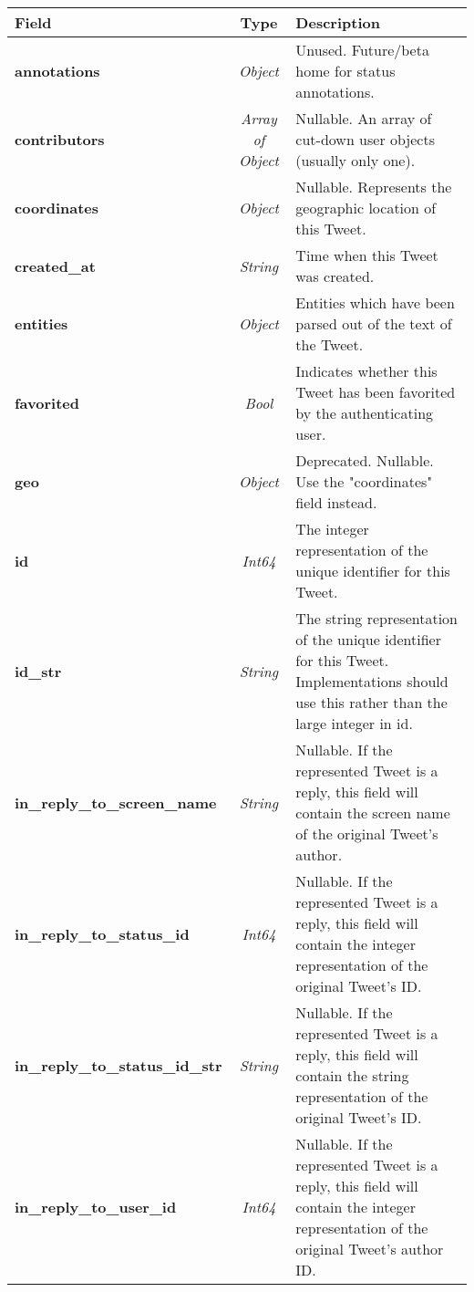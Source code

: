 
	
\begin{table}
\renewcommand{\arraystretch}{1.3}
\centering
\begin{tabular}{|l|c|p{9cm}|} 
\hline \bf Field	&	\bf Type &	\bf Description \\ \hline \hline

\bf annotations						&	\it Object			&	Unused. Future/beta home for status annotations.  \\ \hline
\bf contributors					&	\it Array of Object &	Nullable. An array of cut-down user objects (usually only one).  \\\hline 
\bf coordinates						&	\it Object			&	Nullable. Represents the geographic location of this Tweet.   \\ \hline
\bf created\_at						&	\it String			&	Time when this Tweet was created. \\ \hline
\bf entities						&	\it Object			&	Entities which have been parsed out of the text of the Tweet. \\ \hline
\bf favorited						&	\it Bool			&	Indicates whether this Tweet has been favorited by the authenticating user.  \\ \hline
\bf geo								&	\it Object			&	Deprecated. Nullable. Use the "coordinates" field instead. \\ \hline
\bf id								&	\it Int64			&	The integer representation of the unique identifier for this Tweet.  \\ \hline 
\bf id\_str							&	\it String			&	The string representation of the unique identifier for this Tweet. Implementations should use this rather than the large integer in id. \\ \hline
\bf in\_reply\_to\_screen\_name		&	\it String			&	Nullable. If the represented Tweet is a reply, this field will contain the screen name of the original Tweet's author.\\ \hline
\bf in\_reply\_to\_status\_id		& 	\it Int64			&	Nullable. If the represented Tweet is a reply, this field will contain the integer representation of the original Tweet's ID.  \\ \hline
\bf in\_reply\_to\_status\_id\_str	&	\it String			&	Nullable. If the represented Tweet is a reply, this field will contain the string representation of the original Tweet's ID. \\ \hline
\bf in\_reply\_to\_user\_id			&	\it Int64			& 	Nullable. If the represented Tweet is a reply, this field will contain the integer representation of the original Tweet's author ID. \\ \hline

\end{tabular}
\end{table}
